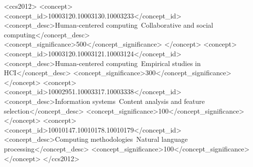 \begin{CCSXML}
<ccs2012>
 <concept>
  <concept_id>10003120.10003130.10003233</concept_id>
  <concept_desc>Human-centered computing~Collaborative and social computing</concept_desc>
  <concept_significance>500</concept_significance>
 </concept>
 <concept>
  <concept_id>10003120.10003121.10003124</concept_id>
  <concept_desc>Human-centered computing~Empirical studies in HCI</concept_desc>
  <concept_significance>300</concept_significance>
 </concept>
 <concept>
  <concept_id>10002951.10003317.10003338</concept_id>
  <concept_desc>Information systems~Content analysis and feature selection</concept_desc>
  <concept_significance>100</concept_significance>
 </concept>
 <concept>
  <concept_id>10010147.10010178.10010179</concept_id>
  <concept_desc>Computing methodologies~Natural language processing</concept_desc>
  <concept_significance>100</concept_significance>
 </concept>
</ccs2012>
\end{CCSXML}


